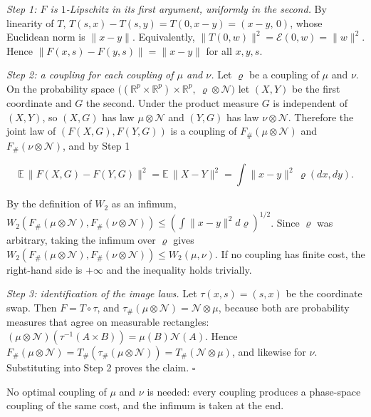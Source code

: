 \documentclass[11pt,a4paper]{article}
\begin{document}
\emph{Step 1: \(F\) is \(1\)-Lipschitz in its first argument, uniformly in the second.} By linearity of \(T\), \(T(s,x)-T(s,y)=T(0,x-y)=(x-y,\,0)\), whose Euclidean norm is \(\|x-y\|\). Equivalently, \(\|T(0,w)\|^2=\mathcal E(0,w)=\|w\|^2\). Hence \(\|F(x,s)-F(y,s)\|=\|x-y\|\) for all \(x,y,s\).




\emph{Step 2: a coupling for each coupling of \(\mu\) and \(\nu\).} Let \(\varrho\) be a coupling of \(\mu\) and \(\nu\). On the probability space \(\bigl((\mathbb R^p\times\mathbb R^p)\times\mathbb R^p,\ \varrho\otimes\mathcal N\bigr)\) let \((X,Y)\) be the first coordinate and \(G\) the second. Under the product measure \(G\) is independent of \((X,Y)\), so \((X,G)\) has law \(\mu\otimes\mathcal N\) and \((Y,G)\) has law \(\nu\otimes\mathcal N\). Therefore the joint law of \((F(X,G),F(Y,G))\) is a coupling of \(F_\#(\mu\otimes\mathcal N)\) and \(F_\#(\nu\otimes\mathcal N)\), and by Step 1


\[\mathbb E\,\|F(X,G)-F(Y,G)\|^2=\mathbb E\,\|X-Y\|^2=\int\|x-y\|^2\,\varrho(dx,dy).\]


By the definition of \(W_2\) as an infimum, \(W_2(F_\#(\mu\otimes\mathcal N),F_\#(\nu\otimes\mathcal N))\le(\int\|x-y\|^2d\varrho)^{1/2}\). Since \(\varrho\) was arbitrary, taking the infimum over \(\varrho\) gives \(W_2(F_\#(\mu\otimes\mathcal N),F_\#(\nu\otimes\mathcal N))\le W_2(\mu,\nu)\). If no coupling has finite cost, the right-hand side is \(+\infty\) and the inequality holds trivially.




\emph{Step 3: identification of the image laws.} Let \(\tau(x,s)=(s,x)\) be the coordinate swap. Then \(F=T\circ\tau\), and \(\tau_\#(\mu\otimes\mathcal N)=\mathcal N\otimes\mu\), because both are probability measures that agree on measurable rectangles: \((\mu\otimes\mathcal N)(\tau^{-1}(A\times B))=\mu(B)\mathcal N(A)\). Hence \(F_\#(\mu\otimes\mathcal N)=T_\#(\tau_\#(\mu\otimes\mathcal N))=T_\#(\mathcal N\otimes\mu)\), and likewise for \(\nu\). Substituting into Step 2 proves the claim. \(\square\)




No optimal coupling of \(\mu\) and \(\nu\) is needed: every coupling produces a phase-space coupling of the same cost, and the infimum is taken at the end.
\end{document}
